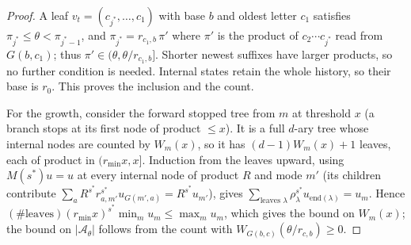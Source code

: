 \begin{proof}
A leaf $v_t=(c_{j^\ast},\dots,c_1)$ with base $b$ and oldest letter $c_1$ satisfies
$\pi_{j^\ast}\le\theta<\pi_{j^\ast-1}$, and $\pi_{j^\ast}=r_{c_1,b}\,\pi'$ where $\pi'$
is the product of $c_2\cdots c_{j^\ast}$ read from $G(b,c_1)$; thus
$\pi'\in(\theta,\theta/r_{c_1,b}]$. Shorter newest suffixes have larger products, so no
further condition is needed. Internal states retain the whole history, so their base is
$r_0$. This proves the inclusion and the count.

For the growth, consider the forward stopped tree from $m$ at threshold $x$ (a branch
stops at its first node of product $\le x$). It is a full $d$-ary tree whose internal
nodes are counted by $W_m(x)$, so it has $(d-1)W_m(x)+1$ leaves, each of product in
$(r_{\min}x,x]$. Induction from the leaves upward, using $M(s^\ast)u=u$ at every internal
node of product $R$ and mode $m'$ (its children contribute
$\sum_aR^{s^\ast}r_{a,m'}^{s^\ast}u_{G(m',a)}=R^{s^\ast}u_{m'}$), gives
$\sum_{\text{leaves }\lambda}\rho_\lambda^{s^\ast}u_{\mathrm{end}(\lambda)}=u_m$.
Hence $(\#\text{leaves})(r_{\min}x)^{s^\ast}\min_mu_m\le\max_mu_m$, which gives the bound
on $W_m(x)$; the bound on $|\mathcal A_\theta|$ follows from the count with
$W_{G(b,c)}(\theta/r_{c,b})\ge0$.
\end{proof}
